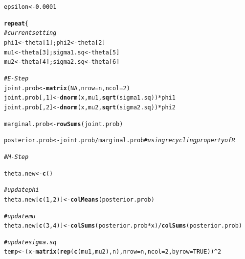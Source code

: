 \documentclass[11pt, a4paper]{article}\usepackage[]{graphicx}\usepackage[]{xcolor}
\makeatletter
\newcommand{\hlnum}[1]{\textcolor[rgb]{0.686,0.059,0.569}{#1}}%
\newcommand{\hlcom}[1]{\textcolor[rgb]{0.678,0.584,0.686}{\textit{#1}}}%
\newcommand{\hlopt}[1]{\textcolor[rgb]{0,0,0}{#1}}%
\newcommand{\hldef}[1]{\textcolor[rgb]{0.345,0.345,0.345}{#1}}%
\newcommand{\hlkwa}[1]{\textcolor[rgb]{0.161,0.373,0.58}{\textbf{#1}}}%
\newcommand{\hlkwb}[1]{\textcolor[rgb]{0.69,0.353,0.396}{#1}}%
\newcommand{\hlkwc}[1]{\textcolor[rgb]{0.333,0.667,0.333}{#1}}%
\newcommand{\hlkwd}[1]{\textcolor[rgb]{0.737,0.353,0.396}{\textbf{#1}}}%
\newenvironment{kframe}{%
 \def\at@end@of@kframe{}%
 \ifinner\ifhmode%
  \def\at@end@of@kframe{\end{minipage}}%
  \begin{minipage}{\columnwidth}%
 \fi\fi%
 \def\FrameCommand##1{\hskip\@totalleftmargin \hskip-\fboxsep
 \colorbox{shadecolor}{##1}\hskip-\fboxsep
     \hskip-\linewidth \hskip-\@totalleftmargin \hskip\columnwidth}%
 \MakeFramed {\advance\hsize-\width
   \@totalleftmargin\z@ \linewidth\hsize
   \@setminipage}}%
 {\par\unskip\endMakeFramed%
 \at@end@of@kframe}
\newenvironment{knitrout}{}{} %
\makeatother
\begin{document}
\begin{enumerate}
\begin{knitrout}
\color{fgcolor}\begin{kframe}
\begin{alltt}
\hldef{epsilon} \hlkwb{<-} \hlnum{0.0001}
\end{alltt}
\end{kframe}
\end{knitrout}

\begin{knitrout}
\color{fgcolor}\begin{kframe}
\begin{alltt}
\hlkwa{repeat}\hldef{\{}
  \hlcom{# current setting}
  \hldef{phi1} \hlkwb{<-} \hldef{theta[}\hlnum{1}\hldef{]; phi2} \hlkwb{<-} \hldef{theta[}\hlnum{2}\hldef{]}
  \hldef{mu1} \hlkwb{<-} \hldef{theta[}\hlnum{3}\hldef{]; sigma1.sq} \hlkwb{<-} \hldef{theta[}\hlnum{5}\hldef{]}
  \hldef{mu2} \hlkwb{<-} \hldef{theta[}\hlnum{4}\hldef{]; sigma2.sq} \hlkwb{<-} \hldef{theta[}\hlnum{6}\hldef{]}

  \hlcom{# E-Step}
  \hldef{joint.prob} \hlkwb{<-} \hlkwd{matrix}\hldef{(}\hlnum{NA}\hldef{,} \hlkwc{nrow} \hldef{= n,} \hlkwc{ncol} \hldef{=} \hlnum{2}\hldef{)}
  \hldef{joint.prob[,}\hlnum{1}\hldef{]} \hlkwb{<-} \hlkwd{dnorm}\hldef{(x, mu1,} \hlkwd{sqrt}\hldef{(sigma1.sq))} \hlopt{*} \hldef{phi1}
  \hldef{joint.prob[,}\hlnum{2}\hldef{]} \hlkwb{<-} \hlkwd{dnorm}\hldef{(x, mu2,} \hlkwd{sqrt}\hldef{(sigma2.sq))} \hlopt{*} \hldef{phi2}

  \hldef{marginal.prob} \hlkwb{<-} \hlkwd{rowSums}\hldef{(joint.prob)}

  \hldef{posterior.prob} \hlkwb{<-} \hldef{joint.prob} \hlopt{/} \hldef{marginal.prob} \hlcom{# using recycling property of R}

  \hlcom{# M-Step}

  \hldef{theta.new} \hlkwb{<-} \hlkwd{c}\hldef{()}

  \hlcom{# update phi}
  \hldef{theta.new[}\hlkwd{c}\hldef{(}\hlnum{1}\hldef{,} \hlnum{2}\hldef{)]} \hlkwb{<-} \hlkwd{colMeans}\hldef{(posterior.prob)}

  \hlcom{# update mu}
  \hldef{theta.new[}\hlkwd{c}\hldef{(}\hlnum{3}\hldef{,} \hlnum{4}\hldef{)]} \hlkwb{<-} \hlkwd{colSums}\hldef{(posterior.prob} \hlopt{*} \hldef{x)} \hlopt{/} \hlkwd{colSums}\hldef{(posterior.prob)}

  \hlcom{# update sigma.sq}
  \hldef{temp} \hlkwb{<-} \hldef{(x} \hlopt{-} \hlkwd{matrix}\hldef{(}\hlkwd{rep}\hldef{(}\hlkwd{c}\hldef{(mu1, mu2), n),} \hlkwc{nrow} \hldef{= n,} \hlkwc{ncol} \hldef{=} \hlnum{2}\hldef{,} \hlkwc{byrow} \hldef{=} \hlnum{TRUE}\hldef{))}\hlopt{^}\hlnum{2}


\end{alltt}
\end{kframe}
\end{knitrout}
\end{enumerate}
\end{document}
